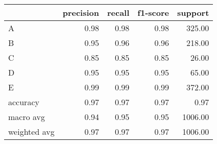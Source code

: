 \begin{tabular}{|l|r|r|r|r|}
\hline
{} &  precision &  recall &  f1-score &  support \\
\hline
A            &       0.98 &    0.98 &      0.98 &   325.00 \\
B            &       0.95 &    0.96 &      0.96 &   218.00 \\
C            &       0.85 &    0.85 &      0.85 &    26.00 \\
D            &       0.95 &    0.95 &      0.95 &    65.00 \\
E            &       0.99 &    0.99 &      0.99 &   372.00 \\
accuracy     &       0.97 &    0.97 &      0.97 &     0.97 \\
macro avg    &       0.94 &    0.95 &      0.95 &  1006.00 \\
weighted avg &       0.97 &    0.97 &      0.97 &  1006.00 \\
\hline
\end{tabular}

